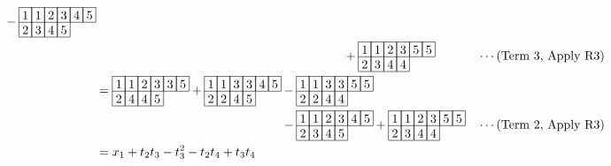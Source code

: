 \begin{align*}
\begin{array}[c]{*{6}c}
\end{array}
-\begin{array}[c]{*{6}c}\cline{1-6}
\lr{1}&\lr{1}&\lr{2}&\lr{3}&\lr{4}&\lr{5}\\\cline{1-6}
\lr{2}&\lr{3}&\lr{4}&\lr{5}\\\cline{1-4}
\end{array}\\
    &\hspace{200pt}
+\begin{array}[c]{*{6}c}\cline{1-6}
\lr{1}&\lr{1}&\lr{2}&\lr{3}&\lr{5}&\lr{5}\\\cline{1-6}
\lr{2}&\lr{3}&\lr{4}&\lr{4}\\\cline{1-4}
\end{array}
    && \cdots (\text{Term 3, Apply R3})\\
    &=
\begin{array}[c]{*{6}c}\cline{1-6}
\lr{1}&\lr{1}&\lr{2}&\lr{3}&\lr{3}&\lr{5}\\\cline{1-6}
\lr{2}&\lr{4}&\lr{4}&\lr{5}\\\cline{1-4}
\end{array}
+\begin{array}[c]{*{6}c}\cline{1-6}
\lr{1}&\lr{1}&\lr{3}&\lr{3}&\lr{4}&\lr{5}\\\cline{1-6}
\lr{2}&\lr{2}&\lr{4}&\lr{5}\\\cline{1-4}
\end{array}
-\begin{array}[c]{*{6}c}\cline{1-6}
\lr{1}&\lr{1}&\lr{3}&\lr{3}&\lr{5}&\lr{5}\\\cline{1-6}
\lr{2}&\lr{2}&\lr{4}&\lr{4}\\\cline{1-4}
\end{array}\\
    &\hspace{150pt}
-\begin{array}[c]{*{6}c}\cline{1-6}
\lr{1}&\lr{1}&\lr{2}&\lr{3}&\lr{4}&\lr{5}\\\cline{1-6}
\lr{2}&\lr{3}&\lr{4}&\lr{5}\\\cline{1-4}
\end{array}
+\begin{array}[c]{*{6}c}\cline{1-6}
\lr{1}&\lr{1}&\lr{2}&\lr{3}&\lr{5}&\lr{5}\\\cline{1-6}
\lr{2}&\lr{3}&\lr{4}&\lr{4}\\\cline{1-4}
\end{array}
    && \cdots (\text{Term 2, Apply R3})\\
&= x_1  + t_2t_3 - t_3^2 - t_2t_4 + t_3t_4\\

\end{align*}
